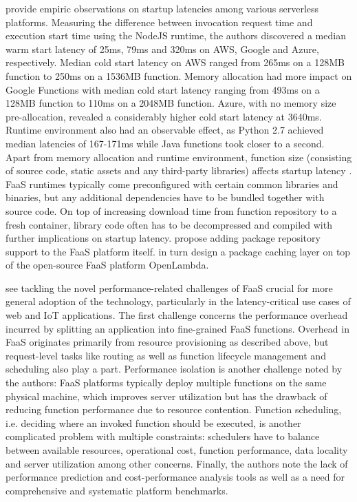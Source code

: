 \textcite{wang18peekingbehindcurtains} provide empiric observations on startup latencies among various serverless platforms. Measuring the difference between invocation request time and execution start time using the NodeJS runtime, the authors discovered a median warm start latency of 25ms, 79ms and 320ms on AWS, Google and Azure, respectively. Median cold start latency on AWS ranged from 265ms on a 128MB function to 250ms on a 1536MB function. Memory allocation had more impact on Google Functions with median cold start latency ranging from 493ms on a 128MB function to 110ms on a 2048MB function. Azure, with no memory size pre-allocation, revealed a considerably higher cold start latency at 3640ms. Runtime environment also had an observable effect, as Python 2.7 achieved median latencies of 167-171ms while Java functions took closer to a second. Apart from memory allocation and runtime environment, function size (consisting of source code, static assets and any third-party libraries) affects startup latency \parencite{hendrickson16openlambda}. FaaS runtimes typically come preconfigured with certain common libraries and binaries, but any additional dependencies have to be bundled together with source code. On top of increasing download time from function repository to a fresh container, library code often has to be decompressed and compiled with further implications on startup latency. \textcite{hendrickson16openlambda} propose adding package repository support to the FaaS platform itself. \textcite{oakes17pipsqueak} in turn design a package caching layer on top of the open-source FaaS platform OpenLambda.

\textcite{van18perfchallenges} see tackling the novel performance-related challenges of FaaS crucial for more general adoption of the technology, particularly in the latency-critical use cases of web and IoT applications. The first challenge concerns the performance overhead incurred by splitting an application into fine-grained FaaS functions. Overhead in FaaS originates primarily from resource provisioning as described above, but request-level tasks like routing as well as function lifecycle management and scheduling also play a part. Performance isolation is another challenge noted by the authors: FaaS platforms typically deploy multiple functions on the same physical machine, which improves server utilization but has the drawback of reducing function performance due to resource contention. Function scheduling, i.e. deciding where an invoked function should be executed, is another complicated problem with multiple constraints: schedulers have to balance between available resources, operational cost, function performance, data locality and server utilization among other concerns. Finally, the authors note the lack of performance prediction and cost-performance analysis tools as well as a need for comprehensive and systematic platform benchmarks.

